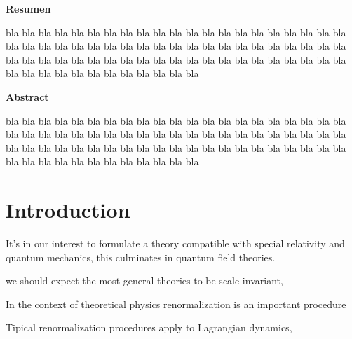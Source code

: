 \documentclass[11pt,a4paper,twoside,pdf]{article}
\numberwithin{equation}{section}
\begin{document}
\newpage
%
\begin{center}
{\bf Resumen}
\bigskip

\begin{minipage}{0.8\linewidth}
bla bla bla bla bla bla bla bla bla bla bla bla bla bla bla
bla bla bla bla bla bla bla bla bla bla bla bla bla bla bla
bla bla bla bla bla bla bla bla bla bla bla bla bla bla bla 
bla bla bla bla bla bla bla bla bla bla bla bla bla bla bla
bla bla bla bla bla bla bla bla bla bla bla bla bla bla bla
\end{minipage}

\newpage

{\bf Abstract} 
\bigskip

\begin{minipage}{0.8\linewidth}
bla bla bla bla bla bla bla bla bla bla bla bla bla bla bla
bla bla bla bla bla bla bla bla bla bla bla bla bla bla bla
bla bla bla bla bla bla bla bla bla bla bla bla bla bla bla 
bla bla bla bla bla bla bla bla bla bla bla bla bla bla bla
bla bla bla bla bla bla bla bla bla bla bla bla bla bla bla
\end{minipage}

\newpage

\end{center}


\tableofcontents


\pagestyle{fancy}
\fancyhead[RO,LE]{\leftmark}
\fancyhead[LO,RE]{\thepage}
\fancyfoot{}

\newpage

\section{Introduction}


It's in our interest to formulate a theory compatible with special relativity and
quantum mechanics, this culminates in quantum field theories. 

we should expect the most general theories to be scale invariant, 

In the context of theoretical physics renormalization is an important procedure 

Tipical renormalization procedures apply to Lagrangian dynamics, 

\newpage
\end{document}
